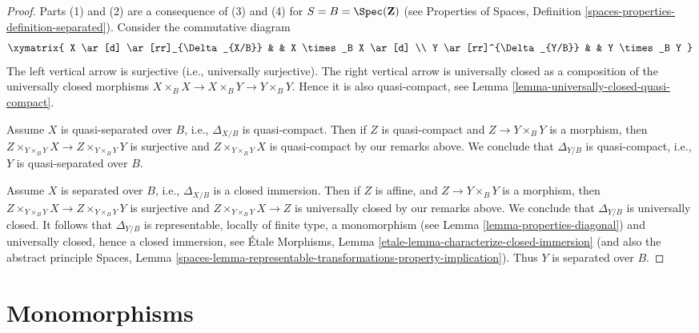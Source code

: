 \begin{proof}
Parts (1) and (2) are a consequence of (3) and (4) for
$S = B = \Spec(\mathbf{Z})$ (see
Properties of Spaces,
Definition \ref{spaces-properties-definition-separated}).
Consider the commutative diagram
$$
\xymatrix{
X \ar[d] \ar[rr]_{\Delta_{X/B}} & & X \times_B X \ar[d] \\
Y \ar[rr]^{\Delta_{Y/B}} & & Y \times_B Y
}
$$
The left vertical arrow is surjective (i.e., universally surjective).
The right vertical arrow is universally closed as a composition
of the universally closed morphisms
$X \times_B X \to X \times_B Y \to Y \times_B Y$. Hence it is also
quasi-compact, see
Lemma \ref{lemma-universally-closed-quasi-compact}.

\medskip\noindent
Assume $X$ is quasi-separated over $B$, i.e.,  $\Delta_{X/B}$ is
quasi-compact. Then if $Z$ is quasi-compact and $Z \to Y \times_B Y$ is
a morphism, then $Z \times_{Y \times_B Y} X \to Z \times_{Y \times_B Y} Y$
is surjective and $Z \times_{Y \times_B Y} X$ is quasi-compact by our remarks
above. We conclude that $\Delta_{Y/B}$ is quasi-compact, i.e., $Y$
is quasi-separated over $B$.

\medskip\noindent
Assume $X$ is separated over $B$, i.e., $\Delta_{X/B}$ is a closed
immersion. Then if $Z$ is affine, and $Z \to Y \times_B Y$ is
a morphism, then $Z \times_{Y \times_B Y} X \to Z \times_{Y \times_B Y} Y$
is surjective and $Z \times_{Y \times_B Y} X \to Z$ is universally closed
by our remarks above. We conclude that $\Delta_{Y/B}$ is universally closed.
It follows that $\Delta_{Y/B}$ is representable, locally of finite type, a
monomorphism (see
Lemma \ref{lemma-properties-diagonal})
and universally closed, hence a closed immersion, see
\'Etale Morphisms,
Lemma \ref{etale-lemma-characterize-closed-immersion}
(and also the abstract principle
Spaces, Lemma
\ref{spaces-lemma-representable-transformations-property-implication}).
Thus $Y$ is separated over $B$.
\end{proof}













\section{Monomorphisms}
\label{section-monomorphisms}

